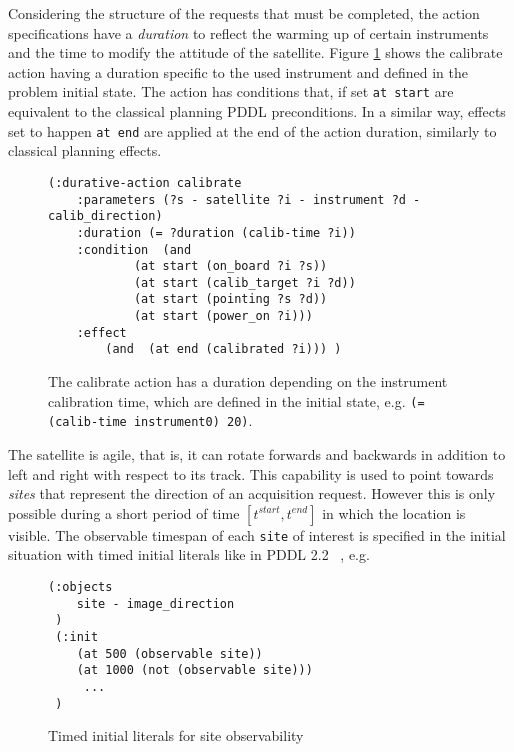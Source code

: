 \documentclass[letterpaper]{article} %
\begin{document}
Considering the structure of the requests that must be completed,
the action specifications have a \emph{duration} to reflect the warming up of certain instruments and the time to modify the attitude of the satellite. Figure \ref{pddl_calibrate} shows the calibrate action having a duration specific to the used instrument and defined in the problem initial state.
%
The action has conditions that, if set \texttt{at start} are equivalent to the classical planning PDDL preconditions. In a similar way, effects set to happen \texttt{at end} are applied at the end of the action duration, similarly to classical planning effects.


\begin{figure}[!h]
	\begin{lstlisting}[language=pddl,mathescape]
(:durative-action calibrate
	:parameters (?s - satellite ?i - instrument ?d - calib_direction)
	:duration (= ?duration (calib-time ?i))
	:condition 	(and
			(at start (on_board ?i ?s))
			(at start (calib_target ?i ?d))
			(at start (pointing ?s ?d))
			(at start (power_on ?i)))
	:effect
		(and  (at end (calibrated ?i))) )
	\end{lstlisting}
	\caption{The calibrate action has a duration depending on the instrument calibration time\label{pddl_calibrate}, which are defined in the initial state, e.g.
{\small\lstinline[language={pddl},basicstyle=\ttfamily]|(= (calib-time instrument0) 20)|}.}
\end{figure}



The satellite is agile, that is, it can rotate forwards and backwards in addition to left and right with respect to its track. This capability is used to point towards \textit{sites} that represent the direction of an acquisition request. However this is only possible during a short period of time $[t^{start}, t^{end}]$ in which the location is visible. The observable timespan of each {\tt site} of interest is specified in the initial situation with timed initial literals like in PDDL 2.2~ \citep{hoffmann2005deterministic}, e.g.

 \begin{figure}[!h]
 \begin{lstlisting}[language=pddl]
 (:objects
 	site - image_direction
 )
 (:init
 	(at 500 (observable site))
 	(at 1000 (not (observable site)))
     ...
 ) \end{lstlisting}
 \caption{Timed initial literals for site observability\label{pddl_initplan_dom}}
 \end{figure}
\end{document}
